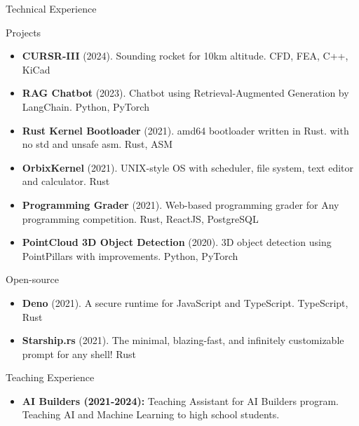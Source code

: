 \documentclass[]{patrickchodev-cv}
\begin{document}
	\begin{cvsection}{Technical Experience}
		\begin{cvsubsection}{Projects}{}{}
			\begin{itemize}
				\item \textbf{CURSR-III} (2024). Sounding rocket for 10km altitude. CFD, FEA, C++, KiCad
				\item \textbf{RAG Chatbot} (2023). Chatbot using Retrieval-Augmented Generation by LangChain. Python, PyTorch
				\item \textbf{Rust Kernel Bootloader} (2021). amd64 bootloader written in Rust. with no std and unsafe asm. Rust, ASM
				\item \textbf{OrbixKernel} (2021).  UNIX-style OS with scheduler, file system, text editor and calculator. Rust
				\item \textbf{Programming Grader} (2021). Web-based programming grader for Any programming competition. Rust, ReactJS, PostgreSQL
				\item \textbf{PointCloud 3D Object Detection} (2020). 3D object detection using PointPillars with improvements. Python, PyTorch
			\end{itemize}
		\end{cvsubsection}
		\begin{cvsubsection}{Open-source}{}{}
			\begin{itemize}
				\item \textbf{Deno} (2021). A secure runtime for JavaScript and TypeScript. TypeScript, Rust
				\item \textbf{Starship.rs} (2021). The minimal, blazing-fast, and infinitely customizable prompt for any shell! Rust
			\end{itemize}
		\end{cvsubsection}
	\end{cvsection}
	
	\begin{cvsection}{Teaching Experience}
		\begin{cvsubsection}{}{}{}	
			\begin{itemize}
				\item \textbf{AI Builders (2021-2024):} Teaching Assistant for AI Builders program. Teaching AI and Machine Learning to high school students.
			\end{itemize}
		\end{cvsubsection}
	\end{cvsection}
\end{document}
